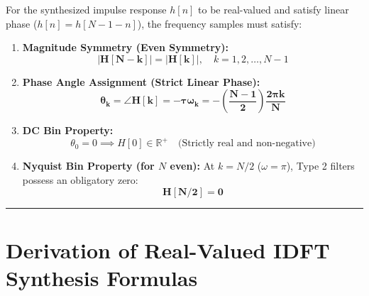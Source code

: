 \documentclass[11pt,a4paper]{article}
\begin{document}
For the synthesized impulse response $h[n]$ to be real-valued and satisfy linear phase ($h[n] = h[N-1-n]$), the frequency samples must satisfy:
\begin{enumerate}
    \item \textbf{Magnitude Symmetry (Even Symmetry):}
    \begin{equation}
    \mathbf{|H[N-k]| = |H[k]|}, \quad k = 1, 2, \dots, N-1
    \end{equation}
    \item \textbf{Phase Angle Assignment (Strict Linear Phase):}
    \begin{equation}
    \mathbf{\theta_k = \angle H[k] = -\tau \omega_k = -\left(\frac{N-1}{2}\right)\frac{2\pi k}{N}}
    \end{equation}
    \item \textbf{DC Bin Property:}
    \begin{equation}
    \theta_0 = 0 \implies H[0] \in \mathbb{R}^+ \quad \text{(Strictly real and non-negative)}
    \end{equation}
    \item \textbf{Nyquist Bin Property (for $N$ even):}
    At $k = N/2$ ($\omega = \pi$), Type 2 filters possess an obligatory zero:
    \begin{equation}
    \mathbf{H[N/2] = 0}
    \end{equation}
\end{enumerate}

\noindent\rule{\textwidth}{0.5pt}

\section{Derivation of Real-Valued IDFT Synthesis Formulas}
\end{document}
